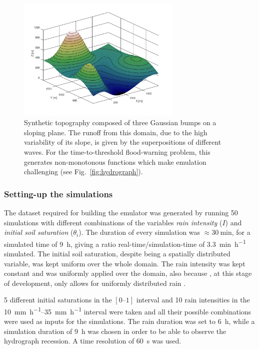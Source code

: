 \begin{figure}[h]
  \centering
  \includegraphics[width=0.7\textwidth]{Figures/topography.png}
  \caption{Synthetic topography composed of three Gaussian bumps on a sloping plane. The runoff from this domain, due to the high variability of its slope, is given by the superpositions of different waves. For the time-to-threshold flood-warning problem, this generates non-monotonous functions which make emulation challenging (see Fig.~\ref{fig:hydrograph}).}
  \label{fig:topography}
\end{figure}

\subsubsection{Setting-up the simulations}
The dataset required for building the emulator was generated by running \num{50} simulations with different combinations of the variables \emph{rain intensity} ($I$) and \emph{initial soil saturation} ($\theta_i$).
The duration of every simulation was $\approx \SI{30}{\minute}$, for a simulated time of \SI{9}{\hour}, giving a ratio real-time/simulation-time of \SI{3.3}{\minute\per\hour} simulated.
The initial soil saturation, despite being a spatially distributed variable, was kept uniform over the whole domain.
The rain intensity was kept constant and was uniformly applied over the domain, also because , at this stage of development, only allows for uniformly distributed rain \autocite{laguerre_documentation_2016}.

\num{5} different initial saturations in the $[\numrange{0}{1}]$ interval and \num{10} rain intensities in the \SIrange{10}{35}{\milli\metre\per\hour} interval were taken and all their possible combinations were used as inputs for the simulations.
The rain duration was set to \SI{6}{\hour}, while a simulation duration of \SI{9}{\hour} was chosen in order to be able to observe the hydrograph recession. A time resolution of \SI{60}{\second} was used.

